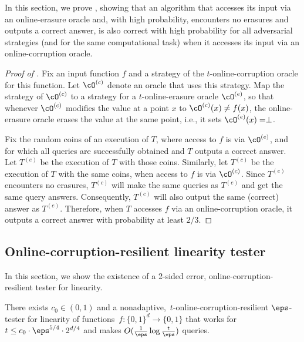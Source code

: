 \documentclass{toc}
\begin{document}
In this section, we prove , showing that an algorithm  that accesses its input via an online-erasure oracle and, with high probability, encounters no erasures and outputs a correct answer, is also correct with high probability for all adversarial strategies (and for the same computational task) when it accesses its input via an online-corruption oracle.

\begin{proof}[Proof of ]
 Fix an input function $f$ and a strategy of the $t$-online-corruption oracle for this function. Let $\cO^{(c)}$ denote an oracle that uses this strategy. Map the strategy of $\cO^{(c)}$ to a strategy for a $t$-online-erasure oracle $\cO^{(e)}$, so that whenever $\cO^{(c)}$ modifies the value at a point $x$ to $\cO^{(c)}(x) \neq f(x)$, the online-erasure oracle erases the value at the same point, i.e.,  it sets $\cO^{(e)}(x) = \perp$. 
 
 Fix the random coins of an execution of $T$, where access to $f$ is via $\cO^{(e)}$, and for which all queries are successfully obtained and $T$ outputs a correct answer. Let $T^{(e)}$ be the execution of $T$ with those coins. Similarly, let $T^{(c)}$ be the execution of $T$ with the same coins, when access to $f$ is via $\cO^{(c)}$. Since $T^{(e)}$ encounters no erasures, $T^{(c)}$ will make the same queries as $T^{(e)}$ and get the same query answers. Consequently, $T^{(c)}$ will also output the same (correct) answer as  $T^{(e)}$. Therefore, when $T$ accesses $f$ via an online-corruption oracle, it outputs a correct answer with probability at least $2/3$.
\end{proof}


%
\subsection{Online-corruption-resilient linearity tester}\label{sec:linearity_corrupt}

In this section, we show the existence of a 2-sided error, online-corruption-resilient tester for linearity. 


\begin{corollary}\label{cor:linearity_corruptions}
There exists 
$c_0 \in (0,1)$ and a nonadaptive,~$t$-online-corruption-resilient $\eps$-tester for linearity of functions~$f\colon \{0,1\}^d \to \{0,1\}$ that  works for $t \leq c_0\cdot\eps^{5/4} \cdot  2^{d/4}$ and makes $O(\frac{1}{\eps}\log \frac{t}{\eps})$ queries.
\end{corollary}
\end{document}
